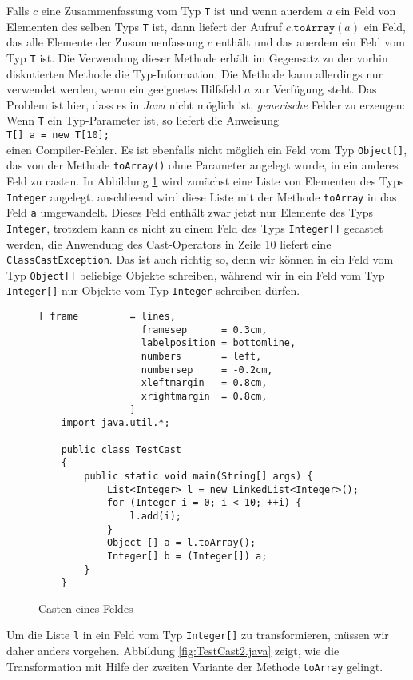 \begin{enumerate}
      Falls $c$ eine Zusammenfassung vom Typ \texttt{T} ist und wenn au\3erdem $a$ ein Feld
      von Elementen des selben Typs \texttt{T} ist, dann liefert der Aufruf
      $c.\mathtt{toArray}(a)$ ein Feld, das alle Elemente der Zusammenfassung $c$ enth\"alt
      und das au\3erdem ein Feld vom Typ \texttt{T} ist.
      Die Verwendung dieser Methode erh\"alt im Gegensatz zu der vorhin diskutierten Methode
      die Typ-Information.  Die Methode kann allerdings nur verwendet werden, wenn ein
      geeignetes Hilfsfeld $a$ zur Verf\"ugung steht.  Das Problem ist hier, dass es in
      \textsl{Java} nicht m\"oglich ist, \emph{generische} Felder zu erzeugen:  Wenn
      \texttt{T} ein Typ-Parameter ist, so liefert die Anweisung
      \\[0.2cm]
      \hspace*{1.3cm}
      \texttt{T[] a = new T[10];}
      \\[0.2cm]
      einen Compiler-Fehler.  Es ist ebenfalls nicht m\"oglich ein Feld vom Typ
      \texttt{Object[]}, das von der Methode \texttt{toArray()} ohne Parameter angelegt
      wurde, in ein anderes Feld zu casten.  In Abbildung \ref{fig:TestCast.java}
      wird zun\"achst eine Liste von Elementen des Typs \texttt{Integer} angelegt.
      anschlie\3end wird diese Liste mit der Methode \texttt{toArray} in das Feld \texttt{a}
      umgewandelt.   Dieses Feld enth\"alt zwar jetzt nur Elemente des Typs
      \texttt{Integer}, trotzdem kann es nicht zu einem Feld des Typs \texttt{Integer[]}
      gecastet werden, die Anwendung des Cast-Operators in Zeile 10 liefert
      eine \texttt{ClassCastException}.  Das ist auch richtig so, denn wir k\"onnen
      in ein Feld vom Typ \texttt{Object[]} beliebige Objekte schreiben, w\"ahrend wir in ein
      Feld vom Typ \texttt{Integer[]} nur Objekte vom Typ \texttt{Integer} schreiben
      d\"urfen.


      \begin{figure}[!h]
\centering
\begin{Verbatim}[ frame         = lines, 
                  framesep      = 0.3cm, 
                  labelposition = bottomline,
                  numbers       = left,
                  numbersep     = -0.2cm,
                  xleftmargin   = 0.8cm,
                  xrightmargin  = 0.8cm,
                ]
    import java.util.*;
    
    public class TestCast 
    { 
        public static void main(String[] args) {
            List<Integer> l = new LinkedList<Integer>();
            for (Integer i = 0; i < 10; ++i) {
                l.add(i);
            }
            Object [] a = l.toArray();
            Integer[] b = (Integer[]) a;
        }
    }
\end{Verbatim}
\vspace*{-0.3cm}
\caption{Casten eines Feldes}
\label{fig:TestCast.java}
\end{figure}
      Um die Liste \texttt{l} in ein Feld vom Typ \texttt{Integer[]} zu transformieren,
      m\"ussen wir daher anders vorgehen.  Abbildung \ref{fig:TestCast2.java}
      zeigt, wie die Transformation mit Hilfe der zweiten Variante der Methode
      \texttt{toArray} gelingt.


\end{enumerate}
